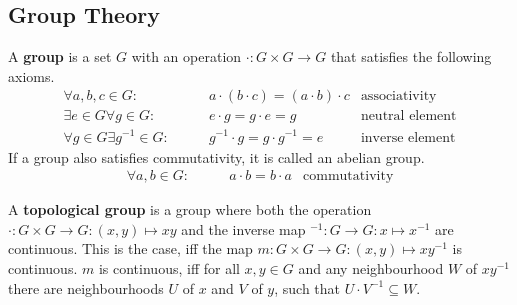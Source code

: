 \subsection{Group Theory}

A \textbf{group} is a set $G$ with an operation $\cdot: G \times G \to G$ that satisfies the following axioms.
\begin{align}
    \forall a, b, c \in G: \qquad & a \cdot (b \cdot c) = (a \cdot b) \cdot c & \text{associativity} \\
    \exists e \in G \forall g \in G: \qquad & e \cdot g = g \cdot e = g & \text{neutral element} \\
    \forall g \in G \exists g^{-1} \in G: \qquad & g^{-1} \cdot g = g \cdot g^{-1} = e & \text{inverse element}
\end{align}
If a group also satisfies commutativity, it is called an abelian group.
\begin{align}
    \forall a, b \in G: \qquad & a \cdot b = b \cdot a & \text{commutativity}
\end{align}

A \textbf{topological group} is a group where both the operation $\cdot: G \times G \to G: (x, y) \mapsto xy$ and the inverse map $^{-1}: G \to G: x \mapsto x^{-1}$ are continuous.
This is the case, iff the map $m: G \times G \to G: (x, y) \mapsto xy^{-1}$ is continuous.
$m$ is continuous, iff for all $x, y \in G$ and any neighbourhood $W$ of $xy^{-1}$ there are neighbourhoods $U$ of $x$ and $V$ of $y$, such that $U \cdot V^{-1} \subseteq W$.
